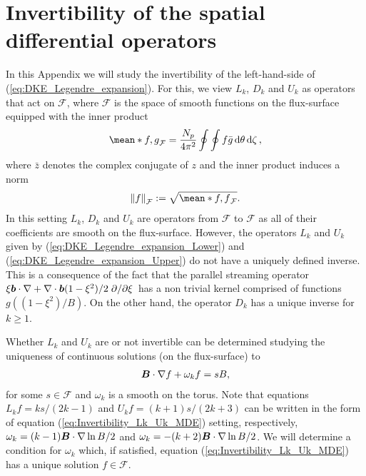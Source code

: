 
\section{Invertibility of the spatial differential operators}
\label{sec:Appendix_Invertibility} 
In this Appendix we will study the invertibility of the left-hand-side of (\ref{eq:DKE_Legendre_expansion}). For this, we view $L_k$, $D_k$ and $U_k$ as operators that act on $\mathcal{F}$, where $\mathcal{F}$ is the space of smooth functions on the flux-surface equipped with the inner product
%
\begin{align}
	\mean*{f,g}_{\mathcal{F}}=\frac{N_p}{4\pi^2}\oint\oint f\bar{g}\dd{\theta}\dd{\zeta},
	\label{eq:Fourier_inner_product}
\end{align}
where $\bar{z}$ denotes the complex conjugate of $z$ and the inner product induces a norm 
%
\begin{align}
	\norm{f}_{\mathcal{F}}:=\sqrt{\mean*{f,f}_{\mathcal{F}}}.
	\label{eq:Fourier_norm}
\end{align}
In this setting $L_k$, $D_k$ and $U_k$ are operators from $\mathcal{F}$ to $\mathcal{F}$ as all of their coefficients are smooth on the flux-surface. However, the operators $L_k$ and $U_k$ given by (\ref{eq:DKE_Legendre_expansion_Lower}) and (\ref{eq:DKE_Legendre_expansion_Upper}) do not have a uniquely defined inverse. This is a consequence of the fact that the parallel streaming operator $\xi \vb*{b}\cdot \nabla+\nabla \cdot \vb*{b} {(1-\xi^2)}/{2}  \pdv*{\xi}$ has a non trivial kernel comprised of functions $g((1-\xi^2)/B)$. On the other hand, the operator $D_k$ has a unique inverse for $k\ge 1$.

Whether $L_k$ and $U_k$ are or not invertible can be determined studying the uniqueness of continuous solutions (on the flux-surface) to
\begin{align}
	 \vb*{B}\cdot \nabla f + \omega_k f = s B,
	 \label{eq:Invertibility_Lk_Uk_MDE}
\end{align}
for some $s\in\mathcal{F}$ and $\omega_k$ is a smooth on the torus. Note that equations $L_k f = ks/(2k-1)$ and $U_k f =(k+1)s/(2k+3)$ can be written in the form of equation (\ref{eq:Invertibility_Lk_Uk_MDE}) setting, respectively, $\omega_k=(k-1)\vb*{B}\cdot\nabla \ln B /2$ and $\omega_k=-(k+2)\vb*{B}\cdot\nabla \ln B /2$. We will determine a condition for $\omega_k$ which, if satisfied, equation (\ref{eq:Invertibility_Lk_Uk_MDE}) has a unique solution $f\in\mathcal{F}$.

